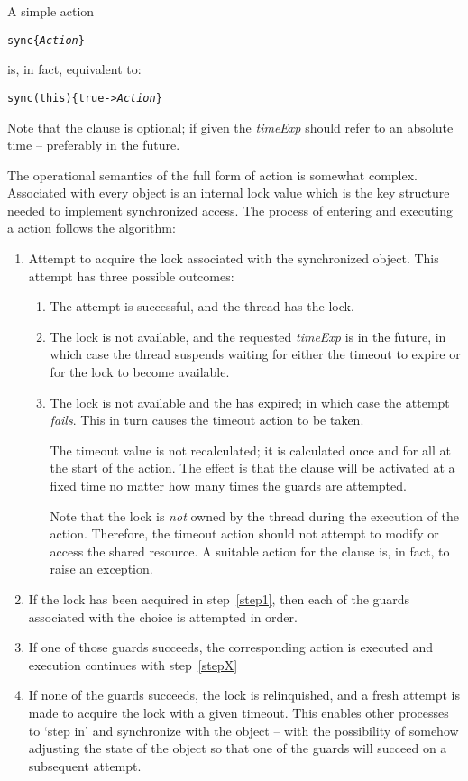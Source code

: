 A simple  action
\begin{alltt}
sync\{ \emph{Action} \}
\end{alltt}
is, in fact, equivalent to:
\begin{alltt}
sync(this)\{ true -> \emph{Action} \}
\end{alltt}

Note that the  clause is optional; if given the \emph{timeExp} should refer to an absolute time -- preferably in the future. 

The operational semantics of the full form of  action is somewhat complex. Associated with every  object is an internal lock value which is the key structure needed to implement synchronized access. The process of entering and executing a  action follows the algorithm:
\begin{enumerate}
\item Attempt to acquire the lock associated with the synchronized object.
\label{step1}
This attempt has three possible outcomes:
\begin{enumerate}
\item The attempt is successful, and the thread has the lock.
\item The lock is not available, and the requested  \emph{timeExp} is in the future, in which case the thread suspends waiting for either the timeout to expire or for the lock to become available.
\item The lock is not available and the  has expired; in which case the attempt \emph{fails}. This in turn causes the timeout action to be taken.

The timeout value is not recalculated; it is calculated once and for all at the start of the  action. The effect is that the  clause will be activated at a fixed time no matter how many times the guards are attempted.

Note that the lock is \emph{not} owned by the thread during the execution of the  action. Therefore, the timeout action should not attempt to modify or access the shared resource. A suitable action for the  clause is, in fact, to raise an exception.
\end{enumerate}
\item If the lock has been acquired in step~\ref{step1}, then each of the guards associated with the  choice is attempted in order.
\item If one of those guards succeeds, the corresponding action is executed and execution continues with step~\ref{stepX}
\item If none of the guards succeeds, the lock is relinquished, and a fresh attempt is made to acquire the lock with a given timeout. This enables other processes to `step in' and synchronize with the object -- with the possibility of somehow adjusting the state of the object so that one of the guards will succeed on a subsequent attempt.


\end{enumerate}
